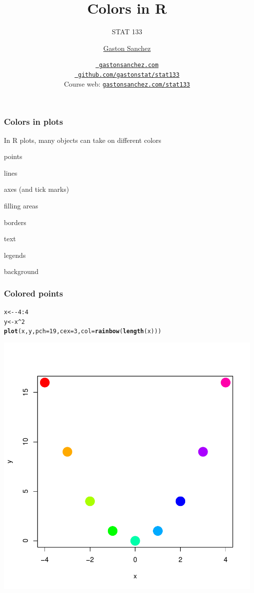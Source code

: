 \documentclass[12pt]{beamer}\usepackage[]{graphicx}\usepackage[]{color}
\title{Colors in R}
\subtitle{STAT 133}
\author{\href{http://www.gastonsanchez.com}{Gaston Sanchez}}
\institute{Department of Statistics, UC{\textendash}Berkeley}
\date{\href{http://www.gastonsanchez.com}{\tt \scriptsize \color{foreground} gastonsanchez.com}
\\[-4pt]
\href{http://github.com/gastonstat/stat133}{\tt \scriptsize \color{foreground} github.com/gastonstat/stat133}
\\[-4pt]
{\scriptsize Course web: \href{http://www.gastonsanchez.com/stat133}{\tt gastonsanchez.com/stat133}}
}
\makeatletter
\newcommand{\hlnum}[1]{\textcolor[rgb]{0.686,0.059,0.569}{#1}}%
\newcommand{\hlopt}[1]{\textcolor[rgb]{0,0,0}{#1}}%
\newcommand{\hlstd}[1]{\textcolor[rgb]{0.345,0.345,0.345}{#1}}%
\newcommand{\hlkwb}[1]{\textcolor[rgb]{0.69,0.353,0.396}{#1}}%
\newcommand{\hlkwc}[1]{\textcolor[rgb]{0.333,0.667,0.333}{#1}}%
\newcommand{\hlkwd}[1]{\textcolor[rgb]{0.737,0.353,0.396}{\textbf{#1}}}%
\newenvironment{kframe}{%
 \def\at@end@of@kframe{}%
 \ifinner\ifhmode%
  \def\at@end@of@kframe{\end{minipage}}%
  \begin{minipage}{\columnwidth}%
 \fi\fi%
 \def\FrameCommand##1{\hskip\@totalleftmargin \hskip-\fboxsep
 \colorbox{shadecolor}{##1}\hskip-\fboxsep
     \hskip-\linewidth \hskip-\@totalleftmargin \hskip\columnwidth}%
 \MakeFramed {\advance\hsize-\width
   \@totalleftmargin\z@ \linewidth\hsize
   \@setminipage}}%
 {\par\unskip\endMakeFramed%
 \at@end@of@kframe}
\newenvironment{knitrout}{}{} %
\makeatother
\begin{document}
{
  \frame{
    \titlepage
  } 
}


\begin{frame}
\begin{center}
\Huge{}
\end{center}
\end{frame}


\begin{frame}
\frametitle{Colors in plots}

In R plots, many objects can take on different colors
\bi
  \item points
  \item lines
  \item axes (and tick marks)
  \item filling areas
  \item borders
  \item text
  \item legends
  \item background
 \ei
\eb

\end{frame}


\begin{frame}[fragile]
\frametitle{Colored points}

\begin{knitrout}\scriptsize
{}\color{fgcolor}\begin{kframe}
\begin{alltt}
\hlstd{x} \hlkwb{<-} \hlopt{-}\hlnum{4}\hlopt{:}\hlnum{4}
\hlstd{y} \hlkwb{<-} \hlstd{x}\hlopt{^}\hlnum{2}
\hlkwd{plot}\hlstd{(x, y,} \hlkwc{pch} \hlstd{=} \hlnum{19}\hlstd{,} \hlkwc{cex} \hlstd{=} \hlnum{3}\hlstd{,} \hlkwc{col} \hlstd{=} \hlkwd{rainbow}\hlstd{(}\hlkwd{length}\hlstd{(x)))}
\end{alltt}
\end{kframe}

{\centering \includegraphics[width=.4\linewidth,height=.4\linewidth]{figure/points_colored1-1} 

}



\end{knitrout}

\end{frame}
\end{document}
